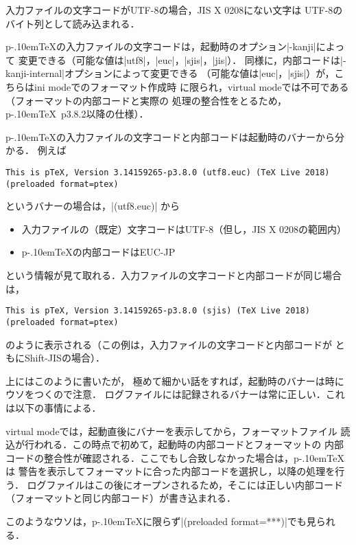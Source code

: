 \documentclass[a4paper,11pt,nomag]{jsarticle}
\def\pTeX{p\kern-.10em\TeX}
\begin{document}
入力ファイルの文字コードがUTF-8の場合，JIS X 0208にない文字は
UTF-8のバイト列として読み込まれる．


\pTeX の入力ファイルの文字コードは，起動時のオプション|-kanji|によって
変更できる（可能な値は|utf8|，|euc|，|sjis|，|jis|）．
同様に，内部コードは|-kanji-internal|オプションによって変更できる
（可能な値は|euc|，|sjis|）が，こちらはini modeでのフォーマット作成時
に限られ，virtual modeでは不可である（フォーマットの内部コードと実際の
処理の整合性をとるため，\pTeX\ p3.8.2以降の仕様）．

\pTeX の入力ファイルの文字コードと内部コードは起動時のバナーから分かる．
例えば
\begin{verbatim}
This is pTeX, Version 3.14159265-p3.8.0 (utf8.euc) (TeX Live 2018)
(preloaded format=ptex)
\end{verbatim}
というバナーの場合は，|(utf8.euc)| から
\begin{itemize}
 \item 入力ファイルの（既定）文字コードはUTF-8（但し，JIS X 0208の範囲内）
 \item \pTeX の内部コードはEUC-JP
\end{itemize}
という情報が見て取れる．入力ファイルの文字コードと内部コードが同じ場合は，
\begin{verbatim}
This is pTeX, Version 3.14159265-p3.8.0 (sjis) (TeX Live 2018)
(preloaded format=ptex)
\end{verbatim}
のように表示される（この例は，入力ファイルの文字コードと内部コードが
ともにShift-JISの場合）．

\begin{dangerous}
上にはこのように書いたが，
極めて細かい話をすれば，起動時のバナーは時にウソをつくので注意．
ログファイルには記録されるバナーは常に正しい．これは以下の事情による．

virtual modeでは，起動直後にバナーを表示してから，フォーマットファイル
読込が行われる．この時点で初めて，起動時の内部コードとフォーマットの
内部コードの整合性が確認される．ここでもし合致しなかった場合は，\pTeX は
警告を表示してフォーマットに合った内部コードを選択し，以降の処理を行う．
ログファイルはこの後にオープンされるため，そこには正しい内部コード
（フォーマットと同じ内部コード）が書き込まれる\cite{build55}．

このようなウソは，\pTeX に限らず|(preloaded format=***)|でも見られる．
\end{dangerous}
\end{document}
